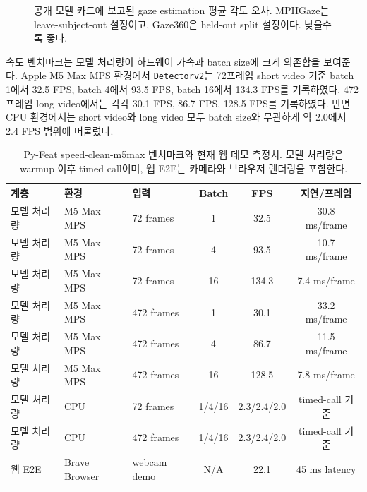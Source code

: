 \documentclass[11pt]{article}
\newcommand{\detector}{\texttt{Detectorv2}}
\begin{document}
\begin{figure}[t]
\centering
{}
\caption{공개 모델 카드에 보고된 gaze estimation 평균 각도 오차. MPIIGaze는 leave-subject-out 설정이고, Gaze360은 held-out split 설정이다. 낮을수록 좋다.}
\label{fig:gaze-error}
\end{figure}

속도 벤치마크는 모델 처리량이 하드웨어 가속과 batch size에 크게 의존함을 보여준다. Apple M5 Max MPS 환경에서 \detector{}는 72프레임 short video 기준 batch 1에서 32.5 FPS, batch 4에서 93.5 FPS, batch 16에서 134.3 FPS를 기록하였다. 472프레임 long video에서는 각각 30.1 FPS, 86.7 FPS, 128.5 FPS를 기록하였다. 반면 CPU 환경에서는 short video와 long video 모두 batch size와 무관하게 약 2.0에서 2.4 FPS 범위에 머물렀다.

\begin{table}[t]
\centering
\caption{Py-Feat speed-clean-m5max 벤치마크와 현재 웹 데모 측정치. 모델 처리량은 warmup 이후 timed call이며, 웹 E2E는 카메라와 브라우저 렌더링을 포함한다.}
\label{tab:speed}
\small
\begin{tabularx}{\linewidth}{lXlccc}
\toprule
계층 & 환경 & 입력 & Batch & FPS & 지연/프레임 \\
\midrule
모델 처리량 & M5 Max MPS & 72 frames & 1 & 32.5 & 30.8 ms/frame \\
모델 처리량 & M5 Max MPS & 72 frames & 4 & 93.5 & 10.7 ms/frame \\
모델 처리량 & M5 Max MPS & 72 frames & 16 & 134.3 & 7.4 ms/frame \\
모델 처리량 & M5 Max MPS & 472 frames & 1 & 30.1 & 33.2 ms/frame \\
모델 처리량 & M5 Max MPS & 472 frames & 4 & 86.7 & 11.5 ms/frame \\
모델 처리량 & M5 Max MPS & 472 frames & 16 & 128.5 & 7.8 ms/frame \\
모델 처리량 & CPU & 72 frames & 1/4/16 & 2.3/2.4/2.0 & timed-call 기준 \\
모델 처리량 & CPU & 472 frames & 1/4/16 & 2.3/2.4/2.0 & timed-call 기준 \\
웹 E2E & Brave Browser & webcam demo & N/A & 22.1 & 45 ms latency \\
\bottomrule
\end{tabularx}
\end{table}
\end{document}
